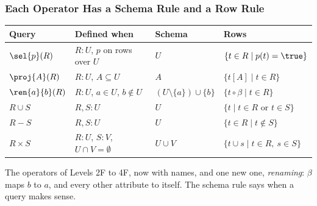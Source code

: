 \documentclass{ltx-talk}
\begin{document}
\begin{frame}
  \frametitle{Each Operator Has a Schema Rule and a Row Rule}
  {\centering\renewcommand{}
    {\headerrow\begin{tabular}{@{}l@{\quad}l@{\quad}l@{\quad}l@{}}
      \hline
      \textbf{Query} & \textbf{Defined when} & \textbf{Schema} &
        \textbf{Rows} \\ \hline
      $\sel{p}(R)$ & $R : U$, $p$ on rows over $U$ & $U$ &
        $\{t \in R \mid p(t) = \true\}$ \\
      $\proj{A}(R)$ & $R : U$, $A \subseteq U$ & $A$ &
        $\{t[A] \mid t \in R\}$ \\
      $\ren{a}{b}(R)$ & $R : U$, $a \in U$, $b \notin U$ &
        $(U \setminus \{a\}) \cup \{b\}$ & $\{t \circ \beta \mid t \in R\}$ \\
      $R \cup S$ & $R, S : U$ & $U$ &
        $\{t \mid t \in R \text{ or } t \in S\}$ \\
      $R - S$ & $R, S : U$ & $U$ & $\{t \in R \mid t \notin S\}$ \\
      $R \times S$ & $R : U$, $S : V$, $U \cap V = \emptyset$ & $U \cup V$ &
        $\{t \cup s \mid t \in R,\ s \in S\}$ \\ \hline
    \end{tabular}}\par}
  \medskip
  The operators of Levels 2F to 4F, now with names, and one new one,
  \emph{renaming}: $\beta$ maps $b$ to $a$, and every other attribute to
  itself. The schema rule says when a query makes sense.
\end{frame}
\end{document}
